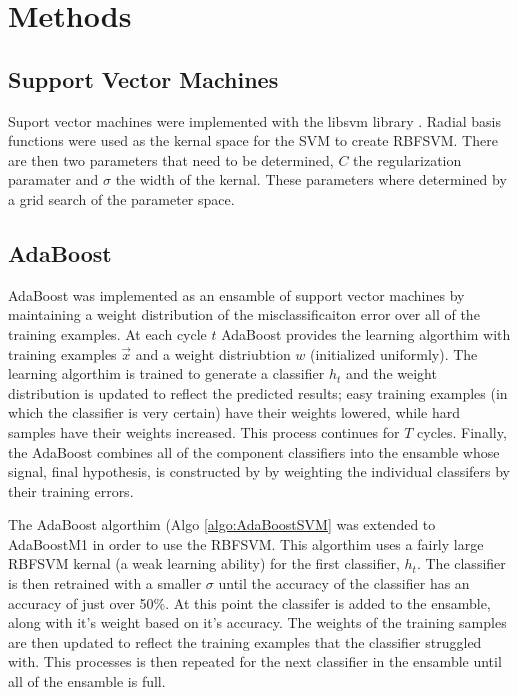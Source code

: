 \section{Methods}
\label{sec:Methods}

\subsection{Support Vector Machines}

Suport vector machines were implemented with the libsvm library \cite{li_adaboost_2008}.
Radial basis functions were used as the kernal space for the SVM to create RBFSVM.
There are then two parameters that need to be determined, $C$ the regularization paramater and $\sigma$ the width of the kernal.
These parameters where determined by a grid search of the parameter space.

\subsection{AdaBoost}

AdaBoost was implemented as an ensamble of support vector machines by maintaining a weight distribution of the misclassificaiton error over all of the training examples.
At each cycle $t$ AdaBoost provides the learning algorthim with training examples $\vec{x}$ and a weight distriubtion $w$ (initialized uniformly).
The learning algorthim is trained to generate a classifier $h_t$ and the weight distribution is updated to reflect the predicted results; easy training examples (in which the classifier is very certain) have their weights lowered, while hard samples have their weights increased.
This process continues for $T$ cycles.
Finally, the AdaBoost combines all of the component classifiers into the ensamble whose signal, final hypothesis, is constructed by by weighting the individual classifers by their training errors.

The AdaBoost algorthim (Algo \ref{algo:AdaBoostSVM} was extended to AdaBoostM1 in order to use the RBFSVM.
This algorthim uses a fairly large RBFSVM kernal (a weak learning ability) for the first classifier, $h_t$.
The classifier is then retrained with a smaller $\sigma$ until the accuracy of the classifier has an accuracy of just over 50\%.
At this point the classifer is added to the ensamble, along with it's weight based on it's accuracy.
The weights of the training samples are then updated to reflect the training examples that the classifier struggled with.
This processes is then repeated for the next classifier in the ensamble until all of the ensamble is full.

